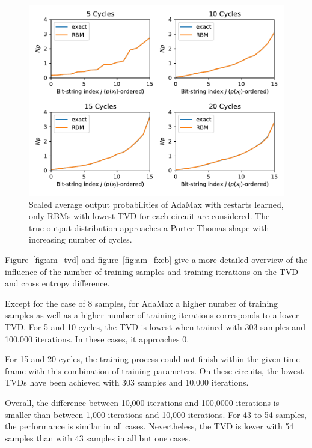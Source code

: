 \begin{figure}[H]
  \centering
  \includegraphics[width=\textwidth]{figures/results/AM-restarts-learned/avgBestPDF.pdf}
  \caption[Averaged best performing scaled output probabilities of AdaMax with restarts learned]{
    Scaled average output probabilities of AdaMax with restarts learned, only RBMs with lowest
    TVD for each circuit are considered. The true 
    output distribution approaches a Porter-Thomas shape with increasing number of cycles.}
  \label{fig:am_avgBestPDF}
\end{figure}

Figure~\ref{fig:am_tvd} and figure~\ref{fig:am_fxeb} give a more detailed overview of the influence of the 
number of training samples and training iterations on the TVD and cross entropy difference.

Except for the case of 8 samples, for AdaMax a higher number of training samples as well as a higher 
number of training iterations corresponds to a lower TVD. For 5 and 10 cycles, the TVD is lowest
when trained with 303 samples and 100,000 iterations. In these cases, it approaches 0.

For 15 and 20 cycles, the training process could not finish
within the given time frame with this combination of training parameters. On these circuits, the lowest TVDs have been achieved with 303 samples 
and 10,000 iterations.

Overall, the difference between 10,000 iterations and 100,0000 iterations is smaller than between 
1,000 iterations and 10,000 iterations. For 43 to 54 samples, the performance is similar in all cases.
Nevertheless, the TVD is lower with 54 samples than with 43 samples in all but one cases.

